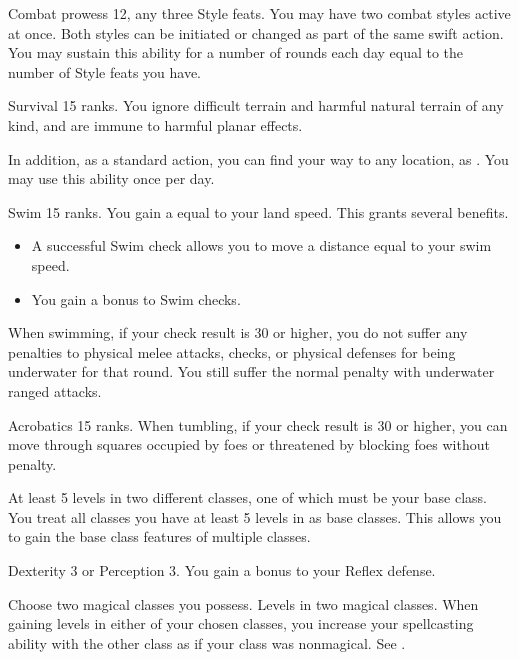 \featpres Combat prowess 12, any three Style feats.
\featben You may have two combat styles active at once.
Both styles can be initiated or changed as part of the same swift action.
You may sustain this ability for a number of rounds each day equal to the number of Style feats you have.

\featpre Survival 15 ranks.
\featben You ignore difficult terrain and harmful natural terrain of any kind, and are immune to harmful planar effects.

In addition, as a standard action, you can find your way to any location, as .
You may use this ability once per day.

\featpre Swim 15 ranks.
\featben You gain a  equal to your land speed.
This grants several benefits.
\begin{itemize}
    \item A successful Swim check allows you to move a distance equal to your swim speed.
    \item You gain a  bonus to Swim checks.
\end{itemize}

When swimming, if your check result is 30 or higher, you do not suffer any penalties to physical melee attacks, checks, or physical defenses for being underwater for that round.
You still suffer the normal penalty with underwater ranged attacks.

\featpre Acrobatics 15 ranks.
\featben When tumbling, if your check result is 30 or higher, you can move through squares occupied by foes or threatened by blocking foes without penalty.

\featpre At least 5 levels in two different classes, one of which must be your base class.
\featben You treat all classes you have at least 5 levels in as base classes.
This allows you to gain the base class features of multiple classes.

\featpre Dexterity 3 or Perception 3.
\featben You gain a  bonus to your Reflex defense.

Choose two magical classes you possess.
\featpres
Levels in two magical classes.
\featben When gaining levels in either of your chosen classes, you increase your spellcasting ability with the other class as if your class was nonmagical.
See .

